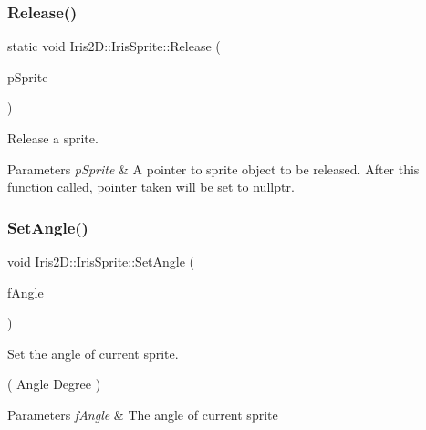 \subsubsection{\texorpdfstring{Release()}{Release()}}
{\footnotesize\ttfamily static void Iris2\+D\+::\+Iris\+Sprite\+::\+Release (\begin{DoxyParamCaption}\item[{\hyperlink{class_iris2_d_1_1_iris_sprite}{Iris\+Sprite} $\ast$\&}]{p\+Sprite }\end{DoxyParamCaption})\hspace{0.3cm}{\ttfamily [static]}}



Release a sprite. 


\begin{DoxyParams}{Parameters}
{\em p\+Sprite} & A pointer to sprite object to be released. After this function called, pointer taken will be set to nullptr. \\
\hline
\end{DoxyParams}
\mbox{\label{class_iris2_d_1_1_iris_sprite_a3fdbc5131b10eb0cb544df0beee82da2}} 
\subsubsection{\texorpdfstring{Set\+Angle()}{SetAngle()}}
{\footnotesize\ttfamily void Iris2\+D\+::\+Iris\+Sprite\+::\+Set\+Angle (\begin{DoxyParamCaption}\item[{float}]{f\+Angle }\end{DoxyParamCaption})}



Set the angle of current sprite. 

( Angle Degree ) 
\begin{DoxyParams}{Parameters}
{\em f\+Angle} & The angle of current sprite \\
\hline
\end{DoxyParams}
\mbox{\label{class_iris2_d_1_1_iris_sprite_a17609cfcb89b4ea714389c40f143c7af}} 
